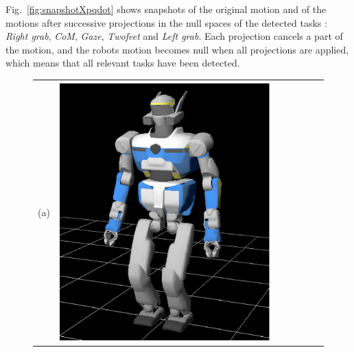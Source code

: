 \documentclass[journal]{IEEEtran}
\begin{document}
Fig.~\ref{fig:snapshotXpqdot} shows snapshots of the original motion
and of the motions after successive projections
in the null spaces of the detected
tasks : \emph{Right grab}, \emph{CoM}, \emph{Gaze}, \emph{Twofeet} and \emph{Left grab}.
Each projection cancels a part of the motion, and the robots motion becomes null when all
projections are applied,
which means that all relevant tasks have been detected.
\begin{figure}[t]
\centering
\begin{tabular}{c@{}c@{}c@{}c@{}c@{}c@{}c}
(a)&
\parbox[c]{2.0cm}{\includegraphics[width=\linewidth]{img/Pqdot0_0.png.ps}} &

\end{tabular}
\end{figure}
\end{document}
